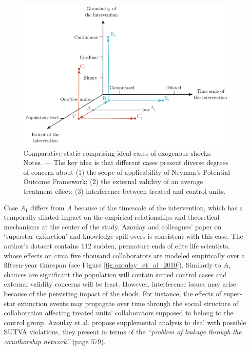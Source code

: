 \documentclass[11pt]{article}
\begin{document}
\begin{refsection}
\begin{figure}[!htbp]
    \begin{center}
      \includegraphics[width=1\textwidth]{exhibits/comparative_static.pdf}
    \end{center}
    \caption{Comparative static comprising ideal cases of exogenous shocks. 
    Notes. --- The key idea is that different cases present diverse 
    degrees of concern about (1) the scope of applicability of Neyman's
    Potential Outcome Framework; (2) the external validity of an average
    treatment effect; (3) interference between treated and control
    units.}
    \label{fig:comparative_static}
\end{figure}

Case $A_{1}$ differs from $A$ because of the timescale of the intervention,
which has a temporally dilated impact on the empirical relationships and 
theoretical mechanisms at the center of the study. Azoulay and colleagues'
\autocite*{azoulay_et_al_2010} paper on `superstar extinction' and knowledge
spill-overs is consistent with this case. The author's dataset contains 112
sudden, premature ends of elite life scientists, whose effects on circa five
thousand collaborators are modeled empirically over a fifteen-year timespan
(see Figure \ref{fig:azoulay_et_al_2010}). Similarly to $A$, chances are
significant the population will contain suited control cases and external
validity concerns will be least. However, interference issues may arise because
of the persisting impact of the shock.  For instance, the effects of super-star
extinction events may propagate over time through the social structure of
collaboration affecting treated units' collaborators supposed
to belong to the control group. Azoulay et al.  \autocite*{azoulay_et_al_2010}
propose supplemental analysis to deal with possible SUTVA violations, they
present in terms of the \textit{``problem of leakage through the coauthorship
network''} (page 579).


\end{refsection}
\end{document}
